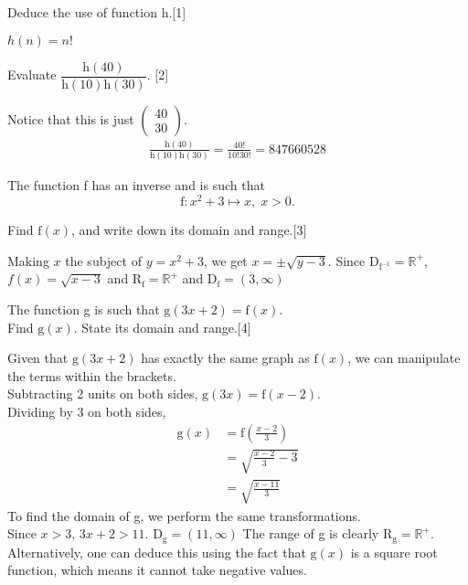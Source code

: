 \documentclass[12pt, a4 paper]{article}
\begin{document}
\begin{outline}[enumerate]
 \2 Deduce the use of function h.\hfill[1]
 \begin{answer}
  \(h(n)=n! \)
 \end{answer}

 \2 Evaluate \(\dfrac{\textrm{h}(40)}{\textrm{h}(10)\textrm{h}(30)}\). \hfill[2]
 \begin{answer}
  Notice that this is just \(\left(\begin{smallmatrix}40\\30\end{smallmatrix}\right)\).
  \begin{align*}
   \frac{\textrm{h}(40)}{\textrm{h}(10)\textrm{h}(30)} = \frac{40!}{10!30!} = 847660528
  \end{align*}
 \end{answer}

 \1 The function f has an inverse and is such that \[\textrm{f}:x^2+3 \mapsto x,\;x>0.\]

 \2 Find \(\textrm{f}(x)\), and write down its domain and range.\hfill[3]
 \begin{answer}
  Making \(x\) the subject of \(y=x^2+3\), we get \(x=\pm\sqrt{y-3}\). Since D\(_{\textrm{f}^{-1}} = \mathbb{R}^+\), \(f(x) = \sqrt{x-3}\) and R\(_\textrm{f}=\mathbb{R}^+\) and D\(_\textrm{f}=(3,\infty)\)
 \end{answer}

 \2 The function g is such that \(\textrm{g}(3x+2)=\textrm{f}(x)\).\\ Find \(\textrm{g}(x)\). State its domain and range.\hfill[4]
 \begin{answer}
  Given that \(\textrm{g}(3x+2)\) has exactly the same graph as \(\textrm{f}(x)\), we can manipulate the terms within the brackets.\\
  Subtracting 2 units on  both sides, \(\textrm{g}(3x)=\textrm{f}(x-2)\).\\
  Dividing by 3 on both sides,
  \begin{align*}
   \textrm{g}(x) & =\textrm{f}\left(\frac{x-2}{3}\right) \\
                 & = \sqrt{\frac{x-2}{3}-3}              \\
                 & = \sqrt{\frac{x-11}{3}}
  \end{align*}
  To find the domain of g, we perform the same transformations.\\
  Since \(x>3\), \(3x+2>11\). D\(_{\textrm{g}}=(11,\infty)\) \newline
  The range of g is clearly R\(_\textrm{g}=\mathbb{R}^+\).\newline \newline
  Alternatively, one can deduce this using the fact that \(\textrm{g}(x)\) is a square root function, which means it cannot take negative values.
 \end{answer}


\end{outline}
\end{document}
